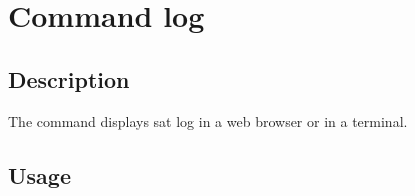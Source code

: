 \documentclass[a4paper,10pt,english]{sphinxmanual}
\begin{document}
\clearpage


\section{Command log}
\label{\detokenize{commands/log:svn}}\label{\detokenize{commands/log:command-log}}\label{\detokenize{commands/log::doc}}

\subsection{Description}
\label{\detokenize{commands/log:description}}
The  command displays sat log in a web browser or in a terminal.


\subsection{Usage}
\end{document}
